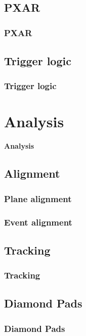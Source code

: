 \documentclass[9pt]{beamer}
\begin{document}
\subsection{PXAR}
\begin{frame}
	\frametitle{PXAR}
\end{frame}
\subsection{Trigger logic}
\begin{frame}
	\frametitle{Trigger logic}
\end{frame}
\section{Analysis}
\begin{frame}
	\begin{alertblock}{
		\begin{center}
			\Large{\textbf{Analysis}}
		\end{center}}
	\end{alertblock}
\end{frame}
\subsection{Alignment}
\begin{frame}
	\frametitle{Plane alignment}
\end{frame}
\begin{frame}
	\frametitle{Event alignment}
\end{frame}
\subsection{Tracking}
\begin{frame}
	\frametitle{Tracking}
\end{frame}
\subsection{Diamond Pads}
\begin{frame}
	\frametitle{Diamond Pads}
\end{frame}
\end{document}
